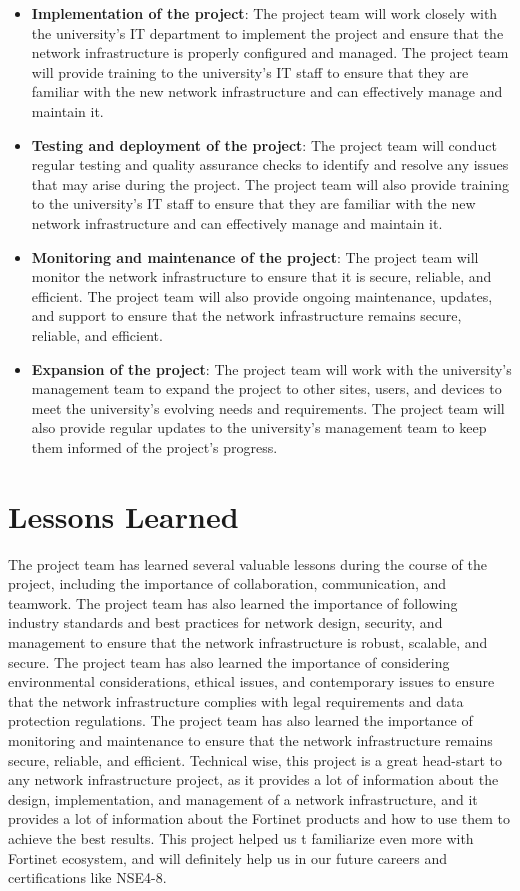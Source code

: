 \documentclass[12pt]{report}
\begin{document}
\begin{itemize}
    \item \textbf{Implementation of the project}: The project team will work closely with the university's IT department to implement the project and ensure that the network infrastructure is properly configured and managed. The project team will provide training to the university's IT staff to ensure that they are familiar with the new network infrastructure and can effectively manage and maintain it.
    \item \textbf{Testing and deployment of the project}: The project team will conduct regular testing and quality assurance checks to identify and resolve any issues that may arise during the project. The project team will also provide training to the university's IT staff to ensure that they are familiar with the new network infrastructure and can effectively manage and maintain it.
    \item \textbf{Monitoring and maintenance of the project}: The project team will monitor the network infrastructure to ensure that it is secure, reliable, and efficient. The project team will also provide ongoing maintenance, updates, and support to ensure that the network infrastructure remains secure, reliable, and efficient.
    \item \textbf{Expansion of the project}: The project team will work with the university's management team to expand the project to other sites, users, and devices to meet the university's evolving needs and requirements. The project team will also provide regular updates to the university's management team to keep them informed of the project's progress.
\end{itemize}

\section{Lessons Learned}
The project team has learned several valuable lessons during the course of the project, including the importance of collaboration, communication, and teamwork. The project team has also learned the importance of following industry standards and best practices for network design, security, and management to ensure that the network infrastructure is robust, scalable, and secure. The project team has also learned the importance of considering environmental considerations, ethical issues, and contemporary issues to ensure that the network infrastructure complies with legal requirements and data protection regulations. The project team has also learned the importance of monitoring and maintenance to ensure that the network infrastructure remains secure, reliable, and efficient.
Technical wise, this project is a great head-start to any network infrastructure project, as it provides a lot of information about the design, implementation, and management of a network infrastructure, and it provides a lot of information about the Fortinet products and how to use them to achieve the best results. This project helped us t familiarize even more with Fortinet ecosystem, and will definitely help us in our future careers and certifications like NSE4-8.
 


\newpage


\end{document}
